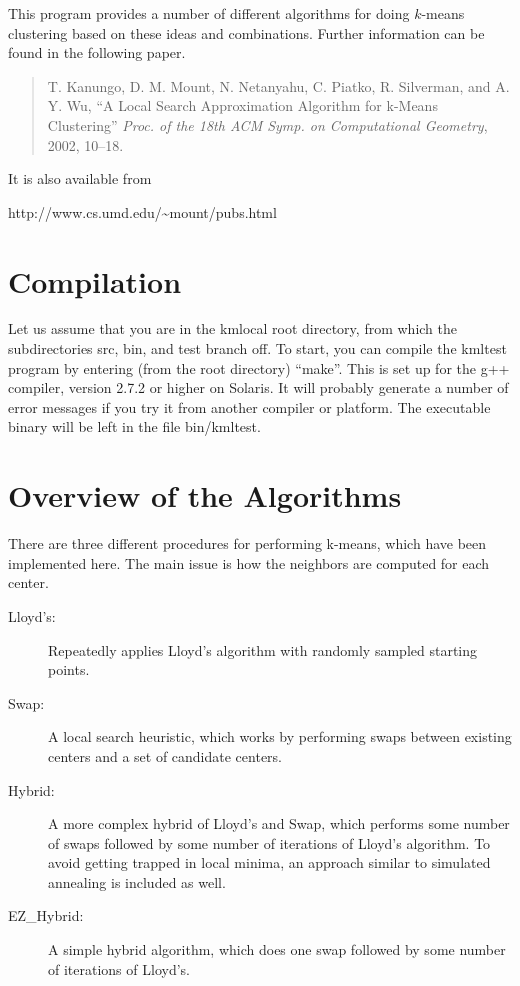 \documentclass[11pt]{article}		%
\begin{document}
This program provides a number of different algorithms for doing $k$-means
clustering based on these ideas and combinations.  Further information
can be found in the following paper.

\begin{quotation}
T. Kanungo, D. M. Mount, N. Netanyahu, C. Piatko, R. Silverman, and A.
Y. Wu, ``A Local Search Approximation Algorithm for k-Means Clustering''
\emph{Proc. of the 18th ACM Symp. on Computational Geometry}, 2002,
10--18.
\end{quotation}

It is also available from

\centerline{\textsf{http://www.cs.umd.edu/\~{}mount/pubs.html}}

\section{Compilation}

Let us assume that you are in the kmlocal root directory, from which the
subdirectories \textsf{src}, \textsf{bin}, and \textsf{test} branch off.
To start, you can compile the kmltest program by entering (from the root
directory) ``\textsf{make}''.  This is set up for the g++ compiler,
version 2.7.2 or higher on Solaris.  It will probably generate a number
of error messages if you try it from another compiler or platform.  The
executable binary will be left in the file \textsf{bin/kmltest}.

\section{Overview of the Algorithms} \label{algo.sec}

There are three different procedures for performing k-means, which have
been implemented here.  The main issue is how the neighbors are computed
for each center.

\begin{description}
\item[Lloyd's:] Repeatedly applies Lloyd's algorithm with randomly
	sampled starting points.
\item[Swap:] A local search heuristic, which works by performing swaps
	between existing centers and a set of candidate centers.
\item[Hybrid:] A more complex hybrid of Lloyd's and Swap, which performs
	some number of swaps followed by some number of iterations of
	Lloyd's algorithm.  To avoid getting trapped in local minima,
	an approach similar to simulated annealing is included as well.
\item[EZ\_Hybrid:] A simple hybrid algorithm, which does one swap
	followed by some number of iterations of Lloyd's.
\end{description}
\end{document}
